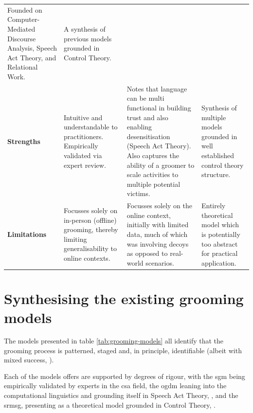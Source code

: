 \documentclass[12pt,a4paper,oneside]{report}
\begin{document}
\begin{longtable}{%
  >{\RaggedRight\arraybackslash}p{3.0cm}%
  >{\RaggedRight\arraybackslash}p{4.0cm}%
  >{\RaggedRight\arraybackslash}p{4.0cm}%
  >{\RaggedRight\arraybackslash}p{4.0cm}%
}
Founded on Computer-Mediated Discourse Analysis, Speech Act Theory, and Relational Work. &
A synthesis of previous models grounded in Control Theory. \\[4pt]
\textbf{Strengths} &
Intuitive and understandable to practitioners. Empirically validated via expert review. &
Notes that language can be multi functional in building trust and also enabling desensitisation (Speech Act Theory). Also captures the ability of a groomer to scale activities to multiple potential victims. &
Synthesis of multiple models grounded in well established control theory structure. \\[4pt]
\textbf{Limitations} &
Focusses solely on in-person (offline) grooming, thereby limiting generalisability to online contexts. &
Focusses solely on the online context, initially with limited data, much of which was involving decoys as opposed to real-world scenarios. &
Entirely theoretical model which is potentially too abstract for practical application. \\[4pt]
\end{longtable}
\endgroup

\section{Synthesising the existing grooming models}
\label{sec:synthesising-the-existing-grooming-models}
The models presented in table \ref{tab:grooming-models} all identify that the grooming process is patterned, staged and, in principle, identifiable (albeit with mixed success, \citep{winters2016knew, winters2017stages}).  

Each of the models offers are supported by degrees of rigour, with the \gls{sgm} being empirically validated by experts in the \gls{csa} field, the \gls{ogdm} leaning into the computational linguistics and grounding itself in Speech Act Theory, \citet{lorenzo-dus2016understanding, lorenzo-dus2017cause}, and the \gls{srmsg}, presenting as a theoretical model grounded in Control Theory, \citet{elliott2017selfregulation}.
\end{document}
